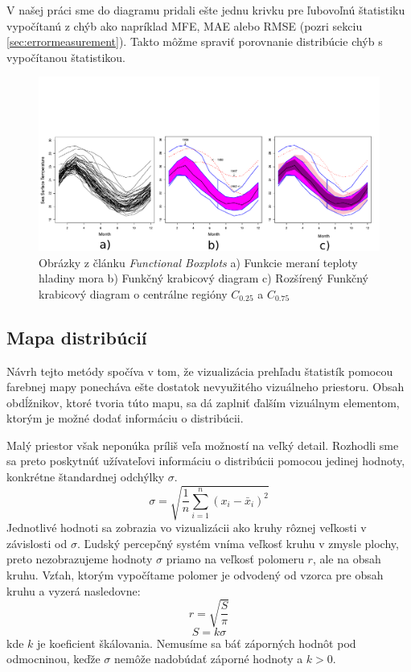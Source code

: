 V našej práci sme do diagramu pridali ešte jednu krivku pre ľubovoľnú štatistiku vypočítanú z chýb ako napríklad MFE, MAE alebo RMSE (pozri sekciu \ref{sec:errormeasurement}). Takto môžme spraviť porovnanie distribúcie chýb s vypočítanou štatistikou.


\begin{figure}
	\centering
	\hspace*{-0.9in}
	\includegraphics[width = 7.5in]{functionalboxplot}
	\caption{Obrázky z článku \textit{Functional Boxplots}  \cite{FunctionalBoxplot}  a) Funkcie meraní teploty hladiny mora b) Funkčný krabicový diagram c) Rozšírený Funkčný krabicový diagram o centrálne regióny $ C_{0.25} $ a $ C_{0.75} $ }
	\label{fig:functionalboxplot}
\end{figure}


\subsection{Mapa distribúcií} 
Návrh tejto metódy spočíva v tom, že vizualizácia prehľadu štatistík pomocou farebnej mapy ponecháva ešte dostatok nevyužitého vizuálneho priestoru. Obsah obdĺžnikov, ktoré tvoria túto mapu, sa dá zaplniť ďalším vizuálnym elementom, ktorým je možné dodať informáciu o distribúcii.

Malý priestor však neponúka príliš veľa možností na veľký detail. Rozhodli sme sa preto poskytnúť užívateľovi informáciu o distribúcii pomocou jedinej hodnoty, konkrétne štandardnej odchýlky $ \sigma $. 
\[
	\sigma = \sqrt{\frac{1}{n} \sum_{i=1}^{n}(x_{i} - \bar{x}_{i})^2  }
\]
Jednotlivé hodnoti sa zobrazia vo vizualizácii ako kruhy rôznej veľkosti v závislosti od $ \sigma $. Ľudský percepčný systém vníma veľkosť kruhu v zmysle plochy, preto nezobrazujeme hodnoty $ \sigma $ priamo na veľkosť polomeru $ r $, ale na obsah kruhu. Vzťah, ktorým vypočítame polomer je odvodený od vzorca pre obsah kruhu a vyzerá nasledovne:
\[
	r = \sqrt{\frac{S}{\pi}}
\]
\[
	S = k\sigma
\]
kde $ k $ je koeficient škálovania. Nemusíme sa báť záporných hodnôt pod odmocninou, keďže $ \sigma $ nemôže nadobúdať záporné hodnoty a $ k > 0 $.

